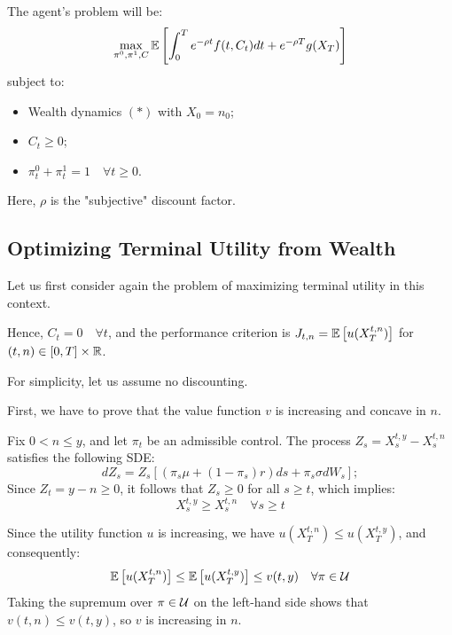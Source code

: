 The agent's problem will be:
\begin{equation}
    \max_{\pi^0, \pi^1, C} \mathbb E \left[ \int_0^T e^{-\rho t} f(t, C_t) dt + e^{-\rho T} g(X_T) \right]
\end{equation}
subject to:
\begin{itemize}
    \item Wealth dynamics $(*)$ with $X_0 = n_0$;
    \item $C_t \geq 0$;
    \item $\pi_t^0 + \pi_t^1 = 1 \quad \forall t \geq 0$.
\end{itemize}
Here, $\rho$ is the "subjective" discount factor.

\subsection*{Optimizing Terminal Utility from Wealth}

Let us first consider again the problem of maximizing terminal utility in this context. 

Hence, $C_t = 0 \quad \forall t$, and the performance criterion is $J_{t,n} = \mathbb E \left[ u(X_T^{t,n}) \right]$ for $(t,n) \in [0,T] \times \mathbb R$. 

For simplicity, let us assume no discounting.

First, we have to prove that the value function $v$ is increasing and concave in $n$.

Fix $0 < n \leq y$, and let $\pi_t$ be an admissible control. 
The process $Z_s = X_s^{t,y} - X_s^{t,n}$ satisfies the following SDE:
\begin{equation*}
    dZ_s = Z_s \left[ (\pi_s \mu + (1-\pi_s) r) ds + \pi_s \sigma dW_s \right];
\end{equation*}
Since $Z_t = y - n \geq 0$, it follows that $Z_s \geq 0$ for all $s \geq t$, which implies:
\begin{equation*}
    X_s^{t,y} \geq X_s^{t,n} \quad \forall s \geq t
\end{equation*}

Since the utility function $u$ is increasing, we have $u(X_T^{t,n}) \leq u(X_T^{t,y})$, and consequently:
\begin{equation*}
    \mathbb E \left[ u(X_T^{t,n}) \right] \leq \mathbb E \left[ u(X_T^{t,y}) \right] \leq v(t,y) \quad \forall \pi \in \mathcal{U}
\end{equation*}
Taking the supremum over $\pi \in \mathcal{U}$ on the left-hand side shows that $v(t,n) \leq v(t,y)$, so $v$ is increasing in $n$.

